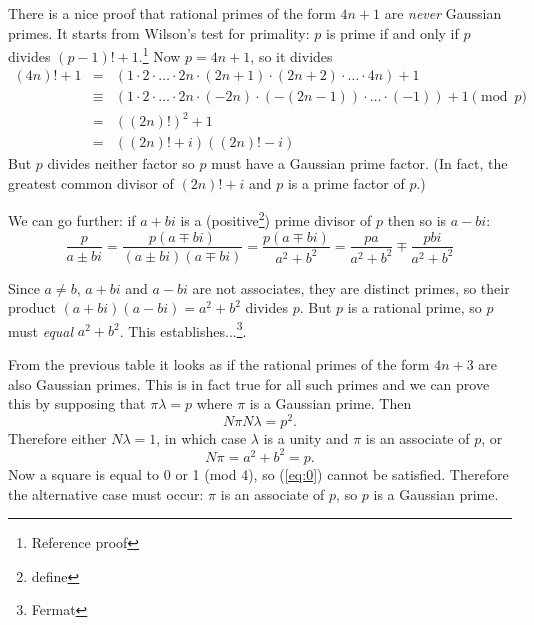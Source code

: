 \documentclass[a4paper]{article}
\begin{document}
There is a nice proof that rational primes of the form $4n + 1$ are \emph{never} Gaussian primes.
It starts from Wilson's test for primality: $p$ is prime if and only if $p$ divides $(p - 1) ! + 1$.\footnote{Reference proof}
Now $p = 4n + 1$, so it divides
\begin{eqnarray}
(4n)! + 1 & = & (1 \cdot 2 \cdot \ldots \cdot 2n \cdot (2n + 1) \cdot (2n + 2) \cdot \ldots \cdot 4n) + 1 \nonumber\\
          & \equiv & (1 \cdot 2 \cdot \ldots \cdot 2n \cdot (-2n) \cdot (-(2n - 1)) \cdot \ldots \cdot (-1)) + 1 \pmod p\nonumber\\
          & = & ((2n)!)^{2} + 1 \nonumber\\
          & = & ((2n)! + i)((2n)! - i) \nonumber
\end{eqnarray}
But $p$ divides neither factor so $p$ must have a Gaussian prime factor.
(In fact, the greatest common divisor of $(2n)! + i$ and $p$ is a prime factor of $p$.)

We can go further: if $a + bi$ is a (positive\footnote{define}) prime divisor of $p$ then so is $a - bi$:
\begin{displaymath}
\frac{p}{a \pm bi} = \frac{p(a \mp bi)}{(a \pm bi)(a \mp bi)} = \frac{p(a \mp bi)}{a^{2} + b^{2}}
= \frac{pa}{a^{2} + b^{2}} \mp \frac{pbi}{a^{2} + b^{2}}
\end{displaymath}

Since $a \neq b$, $a + bi$ and $a - bi$ are not associates, they are distinct primes, so their product
$(a + bi)(a - bi) = a^{2} + b^{2}$ divides $p$. But $p$ is a rational prime, so $p$ must \emph{equal}
$a^{2} + b^{2}$. This establishes...\footnote{Fermat}.

From the previous table it looks as if the rational primes of the form $4n + 3$
are also Gaussian primes. This is in fact true for all such primes and
we can prove this by supposing that $\pi \lambda = p$ where $\pi$ is a Gaussian prime. Then
\begin{displaymath}
N\pi N\lambda = p^{2}.
\end{displaymath}
Therefore either $N\lambda = 1$, in which case $\lambda$ is a unity and $\pi$ is an associate
of $p$, or
\begin{equation} \label{eq:0}
N\pi = a^{2} + b^{2} = p.
\end{equation}
Now a square is equal to 0 or 1 (mod 4), so (\ref{eq:0}) cannot be satisfied. Therefore the alternative
case must occur: $\pi$ is an associate of $p$, so $p$ is a Gaussian prime.
\end{document}
